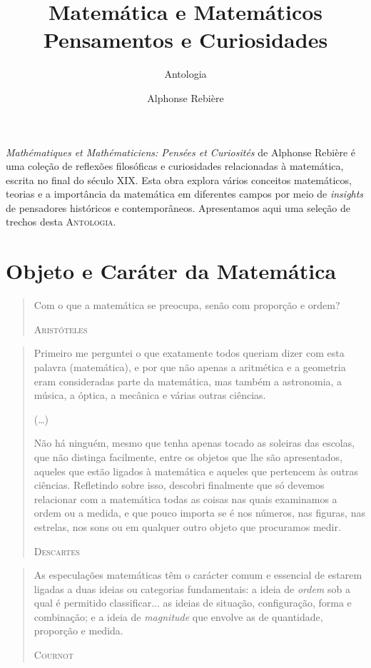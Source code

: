 \documentclass{hipatia}
\title{Matemática e Matemáticos\\
Pensamentos e Curiosidades}
\subtitle{Antologia}
\author{Alphonse Rebière}
\begin{document}
\setcounter{page}{\antologiapage}
\maketitle
\emph{Mathématiques et Mathématiciens: Pensées et Curiosités} de Alphonse Rebière é uma coleção de reflexões filosóficas e curiosidades relacionadas à matemática, escrita no final do século XIX. Esta obra explora vários conceitos matemáticos, teorias e a importância da matemática em diferentes campos por meio de \emph{insights} de pensadores históricos e contemporâneos. 
Apresentamos aqui uma seleção de trechos desta \textsc{Antologia}.


\section{Objeto e Caráter da Matemática}

\begin{quote}
Com o que a matemática se preocupa, senão com proporção e ordem?

\hfill \textsc{Aristóteles}
\end{quote}
 
\begin{quote}
Primeiro me perguntei o que exatamente todos queriam dizer com esta palavra (matemática), e por que não apenas a aritmética e a geometria eram consideradas parte da matemática, mas também a astronomia, a música, a óptica, a mecânica e várias outras ciências.

(\dots)

Não há ninguém, mesmo que tenha apenas tocado as soleiras das escolas, que não distinga facilmente, entre os objetos que lhe são apresentados, aqueles que estão ligados à matemática e aqueles que pertencem às outras ciências. Refletindo sobre isso, descobri finalmente que só devemos relacionar com a matemática todas as coisas nas quais examinamos a ordem ou a medida, e que pouco importa se é nos números, nas figuras, nas estrelas, nos sons ou em qualquer outro objeto que procuramos medir.

\hfill \textsc{Descartes}
\end{quote}
 
\begin{quote}
As especulações matemáticas têm o carácter comum e essencial de estarem ligadas a duas ideias ou categorias fundamentais: a ideia de \emph{ordem} sob a qual é permitido classificar... as ideias de situação, configuração, forma e combinação; e a ideia de \emph{magnitude} que envolve as de quantidade, proporção e medida.

\hfill \textsc{Cournot}
\end{quote}
\end{document}
